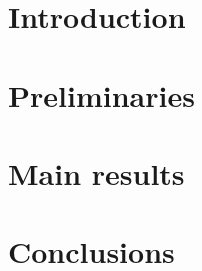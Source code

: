 \documentclass[a4paper,UKenglish]{lipics-v2021}
\begin{document}
	
	\maketitle
	
	\section{Introduction}\label{sec:introduction}
	
	
	
	\section{Preliminaries}\label{sec:preliminaries}
	
	
	
	\section{Main results}\label{sec:results}
	
	
	
	\section{Conclusions}\label{sec:conclusions}
	
	
	
	\newpage
	
	
	
	\newpage
	\appendix
	
	
\end{document}
